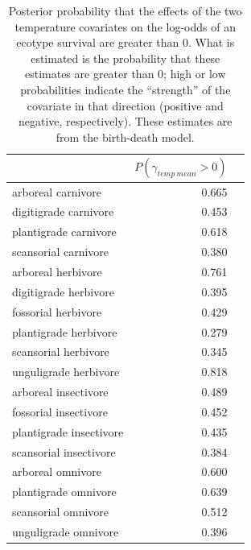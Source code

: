 \documentclass[12pt,letterpaper]{article}
\begin{document}
\begin{table}[ht]
  \centering
  \caption[Posterior probablity of effects of temperature on survival]{Posterior probability that the effects of the two temperature covariates on the log-odds of an ecotype survival are greater than 0. What is estimated is the probability that these estimates are greater than 0; high or low probabilities indicate the ``strength'' of the covariate in that direction (positive and negative, respectively). These estimates are from the birth-death model.}
  \label{tab:surv_temp}
  \begin{tabular}{ l r r }
    \hline
    & \(P(\gamma_{temp\ mean} > 0)\) \\
    \hline
    arboreal carnivore & 0.665 \\ 
    digitigrade carnivore & 0.453 \\ 
    plantigrade carnivore & 0.618 \\ 
    scansorial carnivore & 0.380 \\ 
    arboreal herbivore & 0.761 \\ 
    digitigrade herbivore & 0.395 \\ 
    fossorial herbivore & 0.429 \\ 
    plantigrade herbivore & 0.279 \\ 
    scansorial herbivore & 0.345 \\ 
    unguligrade herbivore & 0.818 \\ 
    arboreal insectivore & 0.489 \\ 
    fossorial insectivore & 0.452 \\ 
    plantigrade insectivore & 0.435 \\ 
    scansorial insectivore & 0.384 \\ 
    arboreal omnivore & 0.600 \\ 
    plantigrade omnivore & 0.639 \\ 
    scansorial omnivore & 0.512 \\ 
    unguligrade omnivore & 0.396 \\ 
    \hline
  \end{tabular}
\end{table}
\end{document}
